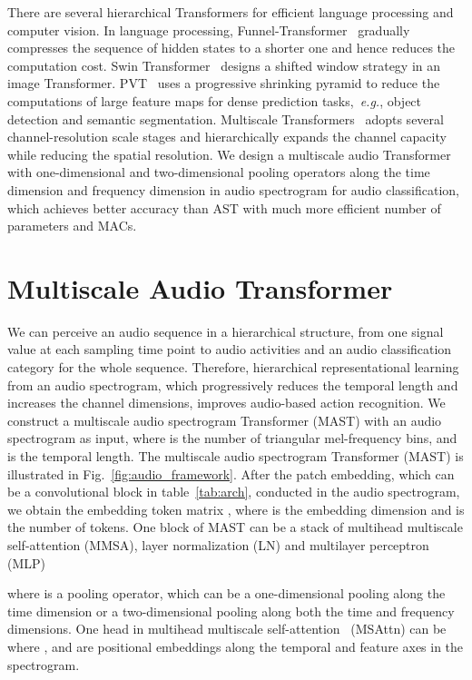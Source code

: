 \documentclass{article}
\def\eg{\emph{e.g.}}
\begin{document}
There are several hierarchical Transformers for efficient language processing and computer vision. In language processing, Funnel-Transformer~\cite{dai2020funnel} gradually compresses the sequence of hidden states to a shorter one and hence reduces the computation cost. Swin Transformer~\cite{liu2021swin} designs a shifted window strategy in an image Transformer. PVT~\cite{wang2021pyramid} uses a progressive shrinking pyramid to reduce the computations of large feature maps for dense prediction tasks,~\eg, object detection and semantic segmentation. Multiscale Transformers~\cite{fan2021multiscale,li2021improved} adopts several channel-resolution scale stages and hierarchically expands the channel capacity while reducing the spatial resolution. We design a multiscale audio Transformer with one-dimensional and two-dimensional pooling operators along the time dimension and frequency dimension in audio spectrogram for audio classification, which achieves better accuracy than AST with much more efficient number of parameters and MACs.
\section{Multiscale Audio Transformer}
\label{sec:method}

We can perceive an audio sequence in a hierarchical structure, from one signal value at each sampling time point to audio activities and an audio classification category for the whole sequence. Therefore, hierarchical representational learning from an audio spectrogram, which progressively reduces the temporal length and increases the channel dimensions, improves audio-based action recognition. We construct a multiscale audio spectrogram Transformer (MAST) with an audio spectrogram  as input, where  is the number of triangular mel-frequency bins, and  is the temporal length. The multiscale audio spectrogram Transformer (MAST) is illustrated in Fig.~\ref{fig:audio_framework}. After the patch embedding, which can be a convolutional block in table~\ref{tab:arch}, conducted in the audio spectrogram, we obtain the embedding token matrix , where  is the embedding dimension and  is the number of tokens. One block of MAST can be a stack of multihead multiscale self-attention (MMSA), layer normalization (LN) and multilayer perceptron (MLP)

where  is a pooling operator, which can be a one-dimensional pooling along the time dimension or a two-dimensional pooling along both the time and frequency dimensions. One head in multihead multiscale self-attention~\cite{li2021improved} (MSAttn) can be 
where ,  and  are positional embeddings along the temporal and feature axes in the spectrogram.  
\end{document}
